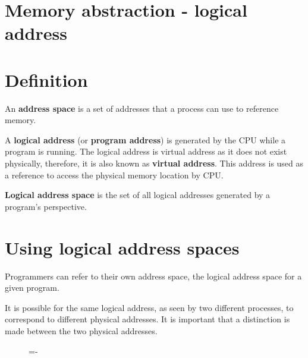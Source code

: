 \documentclass[a4paper]{systems-software}
\begin{document}
\section{Memory abstraction - logical address}

\section*{Definition}

An \textbf{address space} is a set of addresses that a process can use to reference memory.

A \textbf{logical address} (or \textbf{program address}) is generated by the CPU while a program is running. The logical address is virtual address as it does not exist physically, therefore, it is also known as \textbf{virtual address}. This address is used as a reference to access the physical memory location by CPU.

\textbf{Logical address space} is the set of all logical addresses generated by a program’s perspective.


\section*{Using logical address spaces}

Programmers can refer to their own address space, the logical address space for a given program.

It is possible for the same logical address, as seen by two different processes, to correspond to different physical addresses. It is important that a distinction is made between the two physical addresses.

\begin{figure}[H]
  \lineskip=-\fboxrule
\end{figure}
\end{document}
